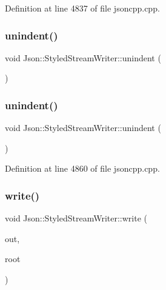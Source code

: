 Definition at line 4837 of file jsoncpp.\+cpp.

\hypertarget{class_json_1_1_styled_stream_writer_a74d8fb9beecd29759d7b79f430386358}{}\label{class_json_1_1_styled_stream_writer_a74d8fb9beecd29759d7b79f430386358} 
\subsubsection{\texorpdfstring{unindent()}{unindent()}\hspace{0.1cm}{\footnotesize\ttfamily [1/2]}}
{\footnotesize\ttfamily void Json\+::\+Styled\+Stream\+Writer\+::unindent (\begin{DoxyParamCaption}{ }\end{DoxyParamCaption})\hspace{0.3cm}{\ttfamily [private]}}

\hypertarget{class_json_1_1_styled_stream_writer_a74d8fb9beecd29759d7b79f430386358}{}\label{class_json_1_1_styled_stream_writer_a74d8fb9beecd29759d7b79f430386358} 
\subsubsection{\texorpdfstring{unindent()}{unindent()}\hspace{0.1cm}{\footnotesize\ttfamily [2/2]}}
{\footnotesize\ttfamily void Json\+::\+Styled\+Stream\+Writer\+::unindent (\begin{DoxyParamCaption}{ }\end{DoxyParamCaption})\hspace{0.3cm}{\ttfamily [private]}}



Definition at line 4860 of file jsoncpp.\+cpp.

\hypertarget{class_json_1_1_styled_stream_writer_a5d89d984fe675641e42c4370cd247774}{}\label{class_json_1_1_styled_stream_writer_a5d89d984fe675641e42c4370cd247774} 
\subsubsection{\texorpdfstring{write()}{write()}\hspace{0.1cm}{\footnotesize\ttfamily [1/2]}}
{\footnotesize\ttfamily void Json\+::\+Styled\+Stream\+Writer\+::write (\begin{DoxyParamCaption}\item[{\hyperlink{config_8h_a37a25be5fca174927780caeb280094ce}{J\+S\+O\+N\+C\+P\+P\+\_\+\+O\+S\+T\+R\+E\+AM} \&}]{out,  }\item[{const \hyperlink{class_json_1_1_value}{Value} \&}]{root }\end{DoxyParamCaption})}



